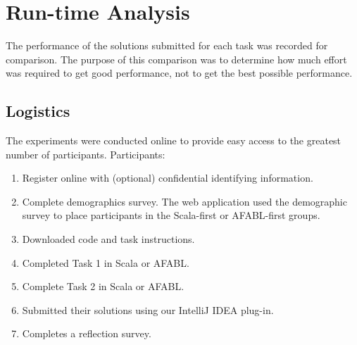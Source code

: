 \section{Run-time Analysis}

The performance of the solutions submitted for each task was recorded for comparison. The purpose of this comparison was to determine how much effort was required to get good performance, not to get the best possible performance.

\subsection{Logistics}

The experiments were conducted online to provide easy access to the greatest number of participants.  Participants:

\begin{enumerate}
\item Register online with (optional) confidential identifying information.
\item Complete demographics survey.  The web application used the demographic survey to place participants in the Scala-first or AFABL-first groups.
\item Downloaded code and task instructions.
\item Completed Task 1 in Scala or AFABL.
\item Complete Task 2 in Scala or AFABL.
\item Submitted their solutions using our IntelliJ IDEA plug-in.
\item Completes a reflection survey.
\end{enumerate}

